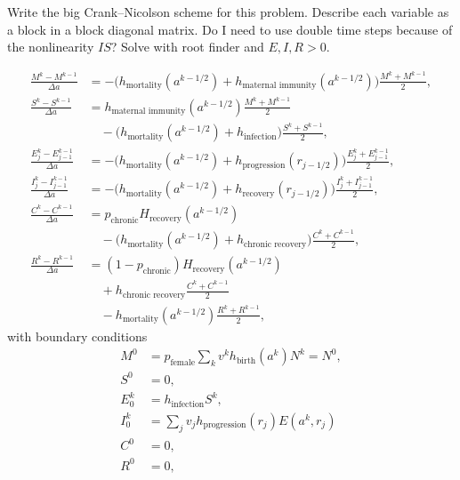 \documentclass[12pt]{article}
\begin{document}
Write the big Crank--Nicolson scheme for this problem.  Describe each
variable as a block in a block diagonal matrix.  Do I need to
use double time steps because of the nonlinearity $I S$?
Solve with root finder and $E, I, R > 0$.

\begin{equation}
  \begin{split}
    \frac{M^k - M^{k - 1}}{\Delta a}
    &= - \big(h_{\text{mortality}}(a^{k - 1/2})
    + h_{\text{maternal immunity}}(a^{k - 1 / 2})\big)
    \frac{M^k + M^{k - 1}}{2},
    \\
    \frac{S^k - S^{k - 1}}{\Delta a}
    &= h_{\text{maternal immunity}}(a^{k - 1 / 2})
    \frac{M^k + M^{k - 1}}{2}
    \\ & \quad {}
    - \big(h_{\text{mortality}}(a^{k - 1 / 2})
    + h_{\text{infection}}\big)
    \frac{S^k + S^{k - 1}}{2},
    \\
    \frac{E_j^k - E_{j - 1}^{k - 1}}{\Delta a}
    &=- \big(h_{\text{mortality}}(a^{k - 1 / 2})
    + h_{\text{progression}}(r_{j - 1 / 2})\big)
    \frac{E_j^k + E_{j - 1}^{k - 1}}{2},
    \\
    \frac{I_j^k - I_{j - 1}^{k - 1}}{\Delta a}
    &= - \big(h_{\text{mortality}}(a^{k - 1 / 2})
    + h_{\text{recovery}}(r_{j - 1 / 2})\big)
    \frac{I_j^k + I_{j - 1}^{k - 1}}{2},
    \\
    \frac{C^k - C^{k - 1}}{\Delta a}
    &= p_{\text{chronic}} H_{\text{recovery}}(a^{k - 1 / 2})
    \\ & \quad {}
    - \big(h_{\text{mortality}}(a^{k - 1 / 2})
    + h_{\text{chronic recovery}}\big) \frac{C^k + C^{k - 1}}{2},
    \\
    \frac{R^k - R^{k - 1}}{\Delta a}
    &= (1 - p_{\text{chronic}}) H_{\text{recovery}}(a^{k - 1 / 2})
    \\ & \quad {}
    + h_{\text{chronic recovery}} \frac{C^k + C^{k - 1}}{2}
    \\ & \quad {}
    - h_{\text{mortality}}(a^{k - 1 / 2}) \frac{R^k + R^{k - 1}}{2},
  \end{split}
\end{equation}
with boundary conditions
\begin{equation}
  \begin{split}
    M^0
    &= p_{\text{female}}
    \sum_k v^k h_{\text{birth}}(a^k) N^k
    = N^0,
    \\
    S^0 &= 0,
    \\
    E_0^k &= h_{\text{infection}} S^k,
    \\
    I_0^k &= \sum_j v_j h_{\text{progression}}(r_j) E(a^k, r_j)
    \\
    C^0 &= 0,
    \\
    R^0 &= 0,
  \end{split}
\end{equation}
\end{document}
